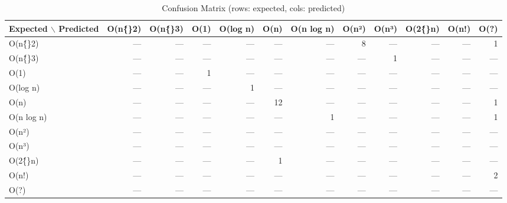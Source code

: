 \begin{table}[h]
  \centering
  \caption{Confusion Matrix (rows: expected, cols: predicted)}
  \label{tab:confusion}
  \begin{tabular}{lrrrrrrrrrrr}
    \toprule
    \textbf{Expected $\backslash$ Predicted} & \textbf{O(n\^\{\}2)} & \textbf{O(n\^\{\}3)} & \textbf{O(1)} & \textbf{O(log n)} & \textbf{O(n)} & \textbf{O(n log n)} & \textbf{O(n²)} & \textbf{O(n³)} & \textbf{O(2\^\{\}n)} & \textbf{O(n!)} & \textbf{O(?)} \\
    \midrule
    O(n\^\{\}2) & --- & --- & --- & --- & --- & --- & 8 & --- & --- & --- & 1 \\
    O(n\^\{\}3) & --- & --- & --- & --- & --- & --- & --- & 1 & --- & --- & --- \\
    O(1) & --- & --- & 1 & --- & --- & --- & --- & --- & --- & --- & --- \\
    O(log n) & --- & --- & --- & 1 & --- & --- & --- & --- & --- & --- & --- \\
    O(n) & --- & --- & --- & --- & 12 & --- & --- & --- & --- & --- & 1 \\
    O(n log n) & --- & --- & --- & --- & --- & 1 & --- & --- & --- & --- & 1 \\
    O(n²) & --- & --- & --- & --- & --- & --- & --- & --- & --- & --- & --- \\
    O(n³) & --- & --- & --- & --- & --- & --- & --- & --- & --- & --- & --- \\
    O(2\^\{\}n) & --- & --- & --- & --- & 1 & --- & --- & --- & --- & --- & --- \\
    O(n!) & --- & --- & --- & --- & --- & --- & --- & --- & --- & --- & 2 \\
    O(?) & --- & --- & --- & --- & --- & --- & --- & --- & --- & --- & --- \\
    \bottomrule
  \end{tabular}
\end{table}

